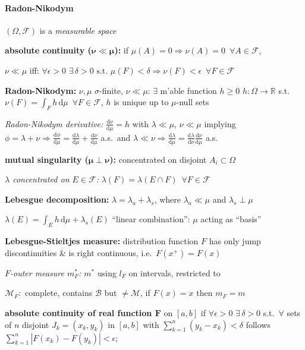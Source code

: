 \documentclass[8pt,twoside]{extarticle}
\begin{document}
\begin{multicols}{2}
\paragraph{Radon-Nikodym} $(\Omega, \mathcal{F})$ is a \textit{measurable space}

\textbf{absolute continuity ($\boldsymbol{\nu \ll \mu}$):} if $\mu(A){=}0 \Rightarrow \nu(A){=}0 \,\,\,\forall A{\in}\mathcal{F}$,

$\nu\ll \mu$ iff: $\forall \epsilon>0 \,\,\exists\, \delta>0 \text{ s.t. } \mu(F)<\delta \Rightarrow \nu(F)<\epsilon\,\,\,\forall F{\in}\mathcal{F}$

\textbf{Radon-Nikodym:} $\nu,\mu$ $\sigma$-finite, $\nu\ll \mu$: $\exists$ m'able function $h\geq 0$ $h:\Omega\to \mathbb{R}$ s.t.\ $\nu(F){=}\int_F h\,\mathrm{d}\mu \,\,\,\forall F{\in}\mathcal{F}$, $h$ is unique up to $\mu$-null sets

\textit{Radon-Nikodym derivative:} $\frac{\mathrm{d}\nu}{\mathrm{d}\mu}=h$ with $\lambda\ll\mu$, $\nu\ll \mu$ implying $\phi=\lambda{+}\nu \Rightarrow  \frac{\mathrm{d}\phi}{\mathrm{d}\mu}=\frac{\mathrm{d}\lambda}{\mathrm{d}\mu}+\frac{\mathrm{d}\nu}{\mathrm{d}\mu}$ a.s.\ and $\lambda\ll\nu\Rightarrow \frac{\mathrm{d}\lambda}{\mathrm{d}\mu}=\frac{\mathrm{d}\lambda}{\mathrm{d}\nu}\frac{\mathrm{d}\nu}{\mathrm{d}\mu}$ a.s. 

\textbf{mutual singularity ($\boldsymbol{\mu \!\perp\! \nu}$):} concentrated on disjoint  $A_i{\subset}\Omega$

\textit{$\lambda$ concentrated on $E{\in}\mathcal{F}$:}  $\lambda(F)=\lambda(E\cap F) \,\,\, \forall F{\in}\mathcal{F}$

\textbf{Lebesgue decomposition:} $\lambda {=} \lambda_a{+}\lambda_s$, where $\lambda_a \ll\mu$ and $\lambda_s{\perp} \mu$

$\lambda(E)=\int_E h \,\mathrm{d}\mu + \lambda_s(E)$ ``linear combination'': $\mu$ acting as ``basis''

\textbf{Lebesgue-Stieltjes measure:} distribution function $F$ has only jump discontinuities \& is right continuous, i.e.\ $F(x^{+})=F(x)$

\textit{$F$-outer measure $m_F^*$:} $m^*$ using $l_F$ on intervals, restricted to 

$\mathcal{M}_F:$ complete, contains $\mathcal{B}$ but $\neq \mathcal{M}$,  if $F(x)=x$ then $m_F=m$

\textbf{absolute continuity of real function $\boldsymbol{F}$} on $[a,b]$ if $\forall \epsilon {>}0\,\, \exists\, \delta{>}0$ s.t.\ $\forall$ sets of $n$ disjoint $J_k =(x_k,y_k)$ in $[a,b]$ with $\sum_{k=1}^n(y_k-x_k)<\delta$ follows $\sum_{k=1}^n|F(x_k)-F(y_k)|<\epsilon$;


\end{multicols}
\end{document}
